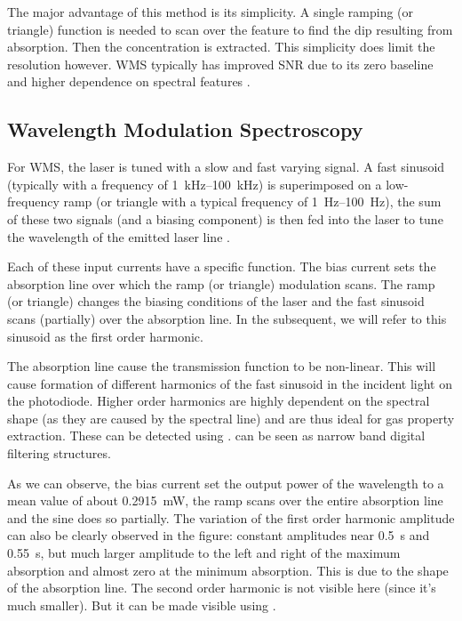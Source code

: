 \documentclass[\home/main.tex]{subfiles}
\begin{document}
    The major advantage of this method is its simplicity. A single ramping (or triangle) function is needed to scan over the feature to find the dip resulting from absorption. Then the concentration is extracted. This simplicity does limit the resolution however. \acrshort{WMS} typically has improved \acrshort{SNR} due to its zero baseline and higher dependence on spectral features \cite{OpticalGasSensingReview}. 

  \subsection{Wavelength Modulation Spectro\-scopy}\label{background:WMS}

    For \acrshort{WMS}, the laser is tuned with a slow and fast varying signal. A fast sinusoid (typically with a frequency of \SIrange{1}{100}{\kilo\hertz}) is superimposed on a low-frequency ramp (or triangle with a typical frequency of \SIrange{1}{100}{\hertz}), the sum of these two signals (and a biasing component) is then fed into the laser to tune the wavelength of the emitted laser line \cite{OSA-freq-int-modulation}.

    Each of these input currents have a specific function. The bias current sets the absorption line over which the ramp (or triangle) modulation scans. The ramp (or triangle) changes the biasing conditions of the laser and the fast sinusoid scans (partially) over the absorption line. In the subsequent, we will refer to this sinusoid as the first order harmonic.
    
    The absorption line cause the transmission function to be non-linear. This will cause formation of different harmonics of the fast sinusoid in the incident light on the photodiode. Higher order harmonics are highly dependent on the spectral shape (as they are caused by the spectral line) and are thus ideal for gas property extraction. These can be detected using .  can be seen as narrow band digital filtering structures. 
    
    As we can observe, the bias current set the output power of the wavelength to a mean value of about \SI{0.2915}{\milli\watt}, the ramp scans over the entire absorption line and the sine does so partially. The variation of the first order harmonic amplitude can also be clearly observed in the figure: constant amplitudes near \SI{0.5}{\second} and \SI{0.55}{\second}, but much larger amplitude to the left and right of the maximum absorption and almost zero at the minimum absorption. This is due to the shape of the absorption line. The second order harmonic is not visible here (since it's much smaller). But it can be made visible using .
    
\end{document}
